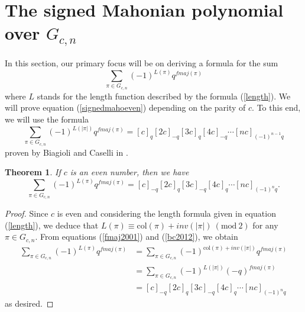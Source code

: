 \documentclass[a4paper,12pt]{article}
\newtheorem{thm}{Theorem}[section]
\begin{document}
		
\section{The signed Mahonian polynomial over $G_{c,n}$}

In this section, our primary focus will be on deriving a formula for the sum
\begin{equation}\label{signedmahoeven}
\sum_{\pi \in G_{c,n}} (-1)^{L(\pi)} q^{fmaj(\pi)} 
\end{equation} 
where $L$ stands for the length function described by the formula (\ref{length}).
We will prove equation (\ref{signedmahoeven}) depending on the parity of $c$. To this end, we will use the formula
\begin{equation}\label{bc2012}
\sum_{\pi \in G_{c,n}} (-1)^{L(|\pi|)} q^{fmaj(\pi)}=[c]_q[2c]_{-q}[3c]_{q}[4c]_{-q}\cdots [nc]_{(-1)^{n-1}q}
\end{equation}
proven by Biagioli and Caselli in \cite{biagioli2012}. 

\begin{thm} \label{has}
   If $c$ is an even number, then we have
\begin{equation}\label{hasan}
\sum_{\pi \in G_{c,n}} (-1)^{L(\pi)} q^{fmaj(\pi)}=[c]_{-q}[2c]_q[3c]_{-q}[4c]_{q}\cdots [nc]_{(-1)^{n}q}.
\end{equation}
\end{thm}

\begin{proof} 
Since $c$ is even and considering the length formula given in equation (\ref{length}), we deduce that $ L(\pi) \equiv \textrm{col}(\pi)+inv(|\pi|)~(\textrm{mod}~2)$ for any $\pi \in G_{c,n}$. From equations (\ref{fmaj2001}) and (\ref{bc2012}), we obtain 
\begin{align*}
\sum_{\pi \in G_{c,n}} (-1)^{L(\pi)} q^{fmaj(\pi)}&=  \sum_{\pi \in G_{c,n}} (-1)^{\textrm{col}(\pi)+inv(|\pi|)} q^{fmaj(\pi)}\\
&= \sum_{\pi \in G_{c,n}} (-1)^{L(|\pi|)} (-q)^{fmaj(\pi)}\\
&=[c]_{-q}[2c]_q[3c]_{-q}[4c]_{q}\cdots [nc]_{(-1)^{n}q}
\end{align*}
as desired.
 
\end{proof}
\end{document}
